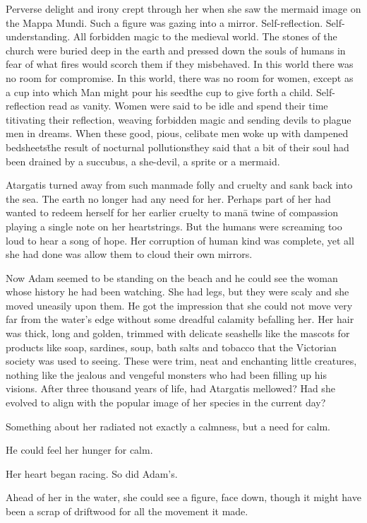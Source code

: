 Perverse delight and irony crept through her when she saw the mermaid
image on the Mappa Mundi. Such a figure was gazing into a
mirror. Self-reflection. Self-understanding. All forbidden magic to
the medieval world. The stones of the church were buried deep in the
earth and pressed down the souls of humans in fear of what fires would
scorch them if they misbehaved. In this world there was no room for
compromise. In this world, there was no room for women, except as a
cup into which Man might pour his seed\=the cup to give forth a
child. Self-reflection read as vanity. Women were said to be idle and
spend their time titivating their reflection, weaving forbidden magic
and sending devils to plague men in dreams. When these good, pious,
celibate men woke up with dampened bedsheets\=the result of nocturnal
pollutions\=they said that a bit of their soul had been drained by a
succubus, a she-devil, a sprite or a mermaid.

Atargatis turned away from such manmade folly and cruelty and sank
back into the sea. The earth no longer had any need for her. Perhaps
part of her had wanted to redeem herself for her earlier cruelty to
man\=a twine of compassion playing a single note on her
heartstrings. But the humans were screaming too loud to hear a song of
hope. Her corruption of human kind was complete, yet all she had done
was allow them to cloud their own mirrors.

\fugue

Now Adam seemed to be standing on the beach and he could see the woman
whose history he had been watching. She had legs, but they were scaly
and she moved uneasily upon them. He got the impression that she
could not move very far from the water’s edge without some dreadful
calamity befalling her. Her hair was thick, long and golden, trimmed
with delicate seashells like the mascots for products like soap,
sardines, soup, bath salts and tobacco that the Victorian society was
used to seeing. These were trim, neat and enchanting little creatures,
nothing like the jealous and vengeful monsters who had been filling up
his visions. After three thousand years of life, had Atargatis mellowed? Had she
evolved to align with the popular image of her species in the current
day?

Something about her radiated not exactly a calmness, but a need for
calm.

He could feel her hunger for calm.

Her heart began racing. So did Adam’s.

Ahead of her in the water, she could see a figure, face down, though
it might have been a scrap of driftwood for all the movement it made.

